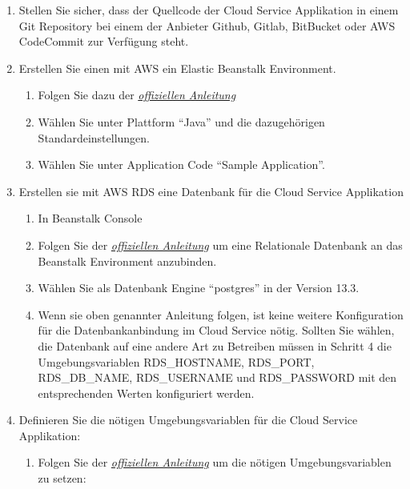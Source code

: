 \begin{enumerate}
    \item Stellen Sie sicher, dass der Quellcode der Cloud Service Applikation in einem Git Repository bei einem der Anbieter Github, Gitlab, BitBucket oder AWS CodeCommit zur Verfügung steht.
    \item Erstellen Sie einen mit AWS ein Elastic Beanstalk Environment.
    \begin{enumerate}
        \item Folgen Sie dazu der \href{https://docs.aws.amazon.com/elasticbeanstalk/latest/dg/GettingStarted.CreateApp.html}{\textit{offiziellen Anleitung}}\cite{aws-elastic}
        \item Wählen Sie unter Plattform ``Java'' und die dazugehörigen Standardeinstellungen.
        \item Wählen Sie unter Application Code ``Sample Application''.
    \end{enumerate}
    \item Erstellen sie mit AWS RDS eine Datenbank für die Cloud Service Applikation
    \begin{enumerate}
        \item In Beanstalk Console
        \item Folgen Sie der \href{https://docs.aws.amazon.com/elasticbeanstalk/latest/dg/using-features.managing.db.html}{\textit{offiziellen Anleitung}}\cite{aws-elastic-rds} um eine Relationale Datenbank an das Beanstalk Environment anzubinden.
        \item Wählen Sie als Datenbank Engine ``postgres'' in der Version 13.3.
        \item Wenn sie oben genannter Anleitung folgen, ist keine weitere Konfiguration für die Datenbankanbindung im Cloud Service nötig.
        Sollten Sie wählen, die Datenbank auf eine andere Art zu Betreiben müssen in Schritt 4 die Umgebungsvariablen RDS\_HOSTNAME, RDS\_PORT, RDS\_DB\_NAME, RDS\_USERNAME und RDS\_PASSWORD mit den entsprechenden Werten konfiguriert werden.
    \end{enumerate}
    \item Definieren Sie die nötigen Umgebungsvariablen für die Cloud Service Applikation:
    \begin{enumerate}
        \item Folgen Sie der \href{https://docs.aws.amazon.com/elasticbeanstalk/latest/dg/environments-cfg-softwaresettings.html}{\textit{offiziellen Anleitung}}\cite{aws-elastic-env} um die nötigen Umgebungsvariablen zu setzen:

\end{enumerate}
\end{enumerate}
